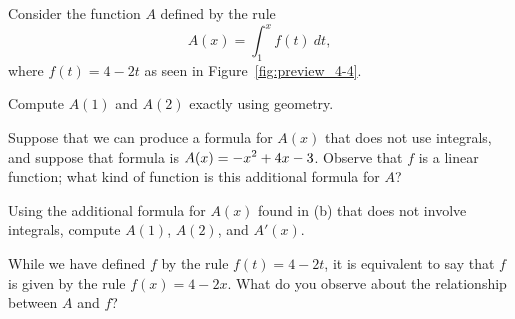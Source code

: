 \begin{pa} \label{PA:4.4}
Consider the function $A$ defined by the rule
\[ A(x) = \int_1^x f(t) \ dt, \]
where $f(t) = 4-2t$ as seen in Figure~\ref{fig:preview_4-4}.

\ba
\item Compute $A(1)$ and $A(2)$ exactly using geometry.

\item Suppose that we can produce a formula for $A(x)$ that does not use integrals, and suppose that formula is $\displaystyle A(x) = -x^2 + 4x - 3$.  Observe that $f$ is a linear function; what kind of function is this additional formula for $A$?


\item Using the additional formula for $A(x)$ found in (b) that does not involve integrals, compute $A(1)$, $A(2)$, and $A'(x)$.

\item While we have defined $f$ by the rule $f(t) = 4-2t$, it is equivalent to say that $f$ is given by the rule $f(x) = 4 - 2x$.  What do you observe about the relationship between $A$ and $f$?
\ea
\end{pa}
\begin{marginfigure}[-3cm] %
\caption{$f(t) = 4-2t$} \label{fig:preview_4-4}
\end{marginfigure} 
\afterpa